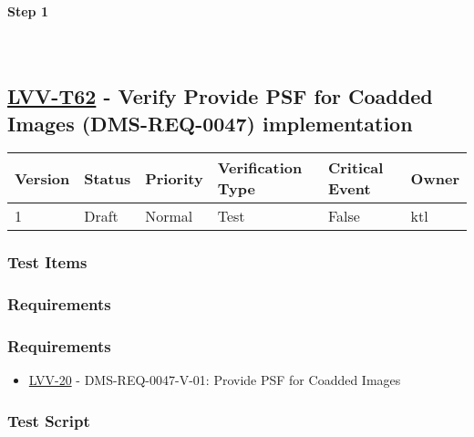 \textbf{Step 1}\\
~\\
~\\

\hypertarget{lvv-t62---verify-provide-psf-for-coadded-images-dms-req-0047-implementation}{%
\subsection{\texorpdfstring{\href{https://jira.lsstcorp.org/secure/Tests.jspa\#/testCase/LVV-T62}{LVV-T62}
- Verify Provide PSF for Coadded Images (DMS-REQ-0047)
implementation}{LVV-T62 - Verify Provide PSF for Coadded Images (DMS-REQ-0047) implementation}}\label{lvv-t62---verify-provide-psf-for-coadded-images-dms-req-0047-implementation}}

\begin{longtable}[]{@{}llllll@{}}
\toprule
Version & Status & Priority & Verification Type & Critical Event &
Owner\tabularnewline
\midrule
\endhead
1 & Draft & Normal & Test & False & ktl\tabularnewline
\bottomrule
\end{longtable}

\hypertarget{test-items-9}{%
\subsubsection{Test Items}\label{test-items-9}}

\hypertarget{requirements-18}{%
\subsubsection{Requirements}\label{requirements-18}}

\hypertarget{requirements-19}{%
\subsubsection{Requirements}\label{requirements-19}}

\begin{itemize}
\tightlist
\item
  \href{https://jira.lsstcorp.org/browse/LVV-20}{LVV-20} -
  DMS-REQ-0047-V-01: Provide PSF for Coadded Images
\end{itemize}

\hypertarget{test-script-9}{%
\subsubsection{Test Script}\label{test-script-9}}


